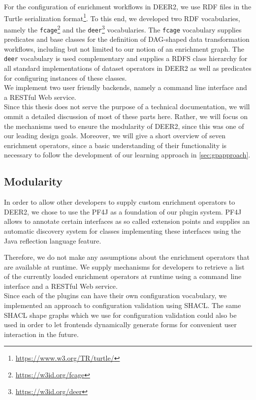 For the configuration of enrichment workflows in \ac{DEER2}, we use \ac{RDF} files in the Turtle serialization format\footnote{\url{https://www.w3.org/TR/turtle/}}.
To this end, we developed two RDF vocabularies, namely the \texttt{fcage}\footnote{\url{https://w3id.org/fcage}} and the \texttt{deer}\footnote{\url{https://w3id.org/deer}} vocabularies.
The \texttt{fcage} vocabulary supplies predicates and base classes for the definition of \ac{DAG}-shaped data transformation workflows, including but not limited to our notion of an enrichment graph.
The \texttt{deer} vocabulary is used complementary and supplies a \ac{RDFS} class hierarchy for all standard implementations of dataset operators in \ac{DEER2} as well as predicates for configuring instances of these classes.\\


We implement two user friendly backends, namely a command line interface and a RESTful Web service.\\

Since this thesis does not serve the purpose of a technical documentation, we will ommit a detailed discussion of most of these parts here.
Rather, we will focus on the mechanisms used to ensure the modularity of \ac{DEER2}, since this was one of our leading design goals.
Moreover, we will give a short overview of seven enrichment operators, since a basic understanding of their functionality is necessary to follow the development of our learning approach in \autoref{sec:gpapproach}.

\subsection{Modularity}
\label{ssec:modularity}

In order to allow other developers to supply custom enrichment operators to \ac{DEER2}, we chose to use the \ac{PF4J} as a foundation of our plugin system.
\ac{PF4J} allows to annotate certain interfaces as so called extension points and supplies an automatic discovery system for classes implementing these interfaces using the Java reflection language feature.

Therefore, we do not make any assumptions about the enrichment operators that are available at runtime.
We supply mechanisms for developers to retrieve a list of the currently loaded enrichment operators at runtime using a command line interface and a RESTful Web service.\\

Since each of the plugins can have their own configuration vocabulary, we implemented an approach to configuration validation using \ac{SHACL}.
The same \ac{SHACL} shape graphs which we use for configuration validation could also be used in order to let frontends dynamically generate forms for convenient user interaction in the future.\\

